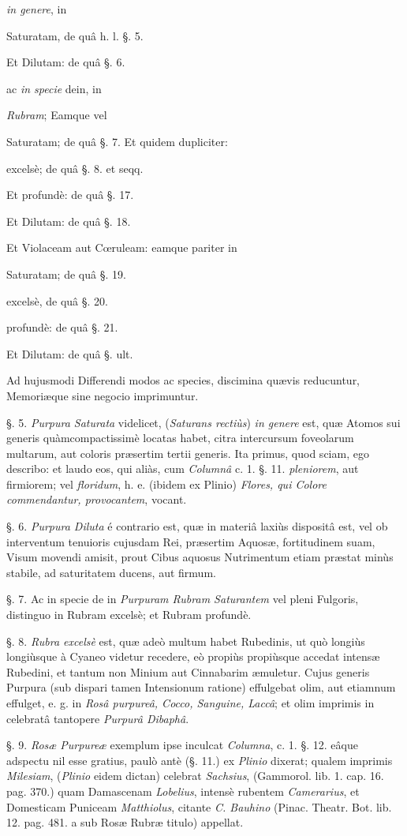 \documentclass[a4paper, 11pt, oneside, polutonikogreek, german]{article}
\begin{document}
\emph{in genere}, in

Saturatam, de quâ h. l. §. 5.

Et Dilutam: de quâ §. 6.

ac \emph{in specie} dein, in

\emph{Rubram}; Eamque vel

Saturatam; de quâ §. 7. Et quidem dupliciter:

excelsè; de quâ §. 8. et seqq.

Et profundè: de quâ §. 17.

Et Dilutam: de quâ §. 18.

Et Violaceam aut Cœruleam: eamque pariter in

Saturatam; de quâ §. 19.

excelsè, de quâ §. 20.

profundè: de quâ §. 21.

Et Dilutam: de quâ §. ult.

Ad hujusmodi Differendi modos ac species, discimina quævis reducuntur, Memoriæque sine negocio imprimuntur.

§. 5. \emph{Purpura Saturata} videlicet, (\emph{Saturans rectiùs}) \emph{in genere} est, quæ Atomos sui generis quàmcompactissimè locatas habet, citra intercursum foveolarum multarum, aut coloris præsertim tertii generis. Ita primus, quod sciam, ego describo: et laudo eos, qui aliàs, cum \emph{Columnâ} c. 1. §. 11. \emph{pleniorem}, aut firmiorem; vel \emph{floridum}, h. e. (ibidem ex Plinio) \emph{Flores, qui Colore commendantur, provocantem}, vocant.

§. 6. \emph{Purpura Diluta} é contrario est, quæ in materiâ laxiùs dispositâ est, vel ob interventum tenuioris cujusdam Rei, præsertim Aquosæ, fortitudinem suam, Visum movendi amisit, prout Cibus aquosus Nutrimentum etiam præstat minùs stabile, ad saturitatem ducens, aut firmum.

§. 7. Ac in specie de in \emph{Purpuram Rubram Saturantem} vel pleni Fulgoris, distinguo in Rubram excelsè; et Rubram profundè.

§. 8. \emph{Rubra excelsè} est, quæ adeò multum habet Rubedinis, ut quò longiùs longiùsque à Cyaneo videtur recedere, eò propiùs propiùsque accedat intensæ Rubedini, et tantum non Minium aut Cinnabarim æmuletur. Cujus generis Purpura (sub dispari tamen Intensionum ratione) effulgebat olim, aut etiamnum effulget, e. g. in \emph{Rosâ purpureâ, Cocco, Sanguine, Laccâ}; et olim imprimis in celebratâ tantopere \emph{Purpurâ Dibaphâ}.

§. 9. \emph{Rosæ Purpureæ} exemplum ipse inculcat \emph{Columna}, c. 1. §. 12. eâque adspectu nil esse gratius, paulò antè (§. 11.) ex \emph{Plinio} dixerat; qualem imprimis \emph{Milesiam}, (\emph{Plinio} eidem dictan) celebrat \emph{Sachsius}, (Gammorol. lib. 1. cap. 16. pag. 370.) quam Damascenam \emph{Lobelius}, intensè rubentem \emph{Camerarius}, et Domesticam Puniceam \emph{Matthiolus}, citante \emph{C. Bauhino} (Pinac. Theatr. Bot. lib. 12. pag. 481. a sub Rosæ Rubræ titulo) appellat.
\end{document}

